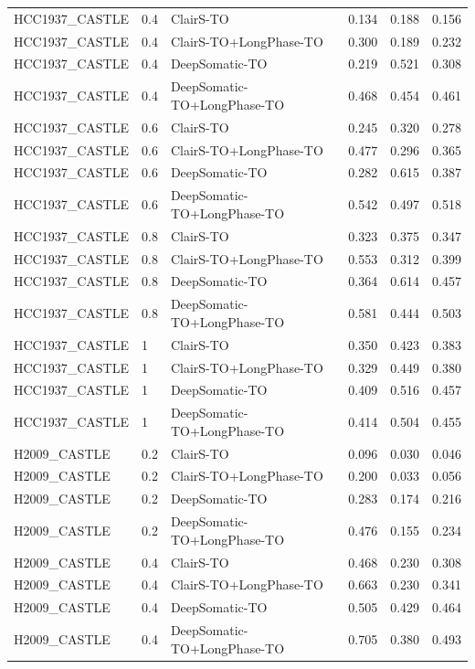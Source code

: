 \documentclass[pdflatex,sn-nature]{sn-jnl}
\begin{document}
{\begin{longtable}{@{}lllccc@{}}
  HCC1937\_CASTLE & 0.4 & ClairS-TO & 0.134 & 0.188 & 0.156 \\
  HCC1937\_CASTLE & 0.4 & ClairS-TO+LongPhase-TO & 0.300 & 0.189 & 0.232 \\
  HCC1937\_CASTLE & 0.4 & DeepSomatic-TO & 0.219 & 0.521 & 0.308 \\
  HCC1937\_CASTLE & 0.4 & DeepSomatic-TO+LongPhase-TO & 0.468 & 0.454 & 0.461 \\
  HCC1937\_CASTLE & 0.6 & ClairS-TO & 0.245 & 0.320 & 0.278 \\
  HCC1937\_CASTLE & 0.6 & ClairS-TO+LongPhase-TO & 0.477 & 0.296 & 0.365 \\
  HCC1937\_CASTLE & 0.6 & DeepSomatic-TO & 0.282 & 0.615 & 0.387 \\
  HCC1937\_CASTLE & 0.6 & DeepSomatic-TO+LongPhase-TO & 0.542 & 0.497 & 0.518 \\
  HCC1937\_CASTLE & 0.8 & ClairS-TO & 0.323 & 0.375 & 0.347 \\
  HCC1937\_CASTLE & 0.8 & ClairS-TO+LongPhase-TO & 0.553 & 0.312 & 0.399 \\
  HCC1937\_CASTLE & 0.8 & DeepSomatic-TO & 0.364 & 0.614 & 0.457 \\
  HCC1937\_CASTLE & 0.8 & DeepSomatic-TO+LongPhase-TO & 0.581 & 0.444 & 0.503 \\
  HCC1937\_CASTLE & 1 & ClairS-TO & 0.350 & 0.423 & 0.383 \\
  HCC1937\_CASTLE & 1 & ClairS-TO+LongPhase-TO & 0.329 & 0.449 & 0.380 \\
  HCC1937\_CASTLE & 1 & DeepSomatic-TO & 0.409 & 0.516 & 0.457 \\
  HCC1937\_CASTLE & 1 & DeepSomatic-TO+LongPhase-TO & 0.414 & 0.504 & 0.455 \\
  \addlinespace
  H2009\_CASTLE & 0.2 & ClairS-TO & 0.096 & 0.030 & 0.046 \\
  H2009\_CASTLE & 0.2 & ClairS-TO+LongPhase-TO & 0.200 & 0.033 & 0.056 \\
  H2009\_CASTLE & 0.2 & DeepSomatic-TO & 0.283 & 0.174 & 0.216 \\
  H2009\_CASTLE & 0.2 & DeepSomatic-TO+LongPhase-TO & 0.476 & 0.155 & 0.234 \\
  H2009\_CASTLE & 0.4 & ClairS-TO & 0.468 & 0.230 & 0.308 \\
  H2009\_CASTLE & 0.4 & ClairS-TO+LongPhase-TO & 0.663 & 0.230 & 0.341 \\
  H2009\_CASTLE & 0.4 & DeepSomatic-TO & 0.505 & 0.429 & 0.464 \\
  H2009\_CASTLE & 0.4 & DeepSomatic-TO+LongPhase-TO & 0.705 & 0.380 & 0.493 \\

\end{longtable}}
\end{document}
